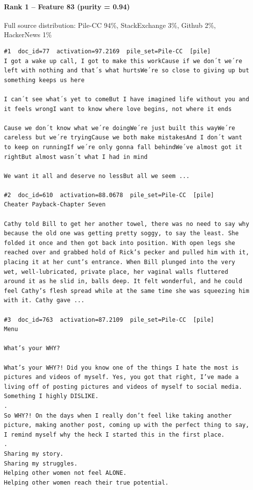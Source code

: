 \paragraph*{Rank 1 -- Feature 83 (purity = 0.94)}

Full source distribution: Pile-CC 94\%, StackExchange 3\%, Github 2\%, HackerNews 1\%

\begin{verbatim}
#1  doc_id=77  activation=97.2169  pile_set=Pile-CC  [pile]
I got a wake up call, I got to make this workCause if we don´t we´re left with nothing and that´s what hurtsWe´re so close to giving up but something keeps us here

I can´t see what´s yet to comeBut I have imagined life without you and it feels wrongI want to know where love begins, not where it ends

Cause we don´t know what we´re doingWe´re just built this wayWe´re careless but we´re tryingCause we both make mistakesAnd I don´t want to keep on runningIf we´re only gonna fall behindWe´ve almost got it rightBut almost wasn´t what I had in mind

We want it all and deserve no lessBut all we seem ...

#2  doc_id=610  activation=88.0678  pile_set=Pile-CC  [pile]
Cheater Payback-Chapter Seven

Cathy told Bill to get her another towel, there was no need to say why because the old one was getting pretty soggy, to say the least. She folded it once and then got back into position. With open legs she reached over and grabbed hold of Rick’s pecker and pulled him with it, placing it at her cunt’s entrance. When Bill plunged into the very wet, well-lubricated, private place, her vaginal walls fluttered around it as he slid in, balls deep. It felt wonderful, and he could feel Cathy’s flesh spread while at the same time she was squeezing him with it. Cathy gave ...

#3  doc_id=763  activation=87.2109  pile_set=Pile-CC  [pile]
Menu

What’s your WHY?

What’s your WHY?! Did you know one of the things I hate the most is pictures and videos of myself. Yes, you got that right, I’ve made a living off of posting pictures and videos of myself to social media. Something I highly DISLIKE.
.
So WHY?! On the days when I really don’t feel like taking another picture, making another post, coming up with the perfect thing to say, I remind myself why the heck I started this in the first place.
.
Sharing my story.
Sharing my struggles.
Helping other women not feel ALONE.
Helping other women reach their true potential.


\end{verbatim}
